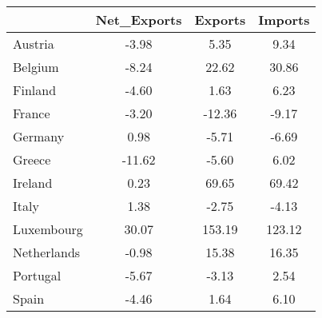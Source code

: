 \begin{table}[htbp]
\begin{tabular}{lccc} \hline \hline
 & Net_Exports  & Exports  & Imports  \\  \hline 
Austria &     -3.98 &      5.35 &      9.34 \\  
Belgium &     -8.24 &     22.62 &     30.86 \\  
Finland &     -4.60 &      1.63 &      6.23 \\  
France &     -3.20 &    -12.36 &     -9.17 \\  
Germany &      0.98 &     -5.71 &     -6.69 \\  
Greece &    -11.62 &     -5.60 &      6.02 \\  
Ireland &      0.23 &     69.65 &     69.42 \\  
Italy &      1.38 &     -2.75 &     -4.13 \\  
Luxembourg &     30.07 &    153.19 &    123.12 \\  
Netherlands &     -0.98 &     15.38 &     16.35 \\  
Portugal &     -5.67 &     -3.13 &      2.54 \\  
Spain &     -4.46 &      1.64 &      6.10 \\  
\hline \hline \end{tabular}
\end{table}
